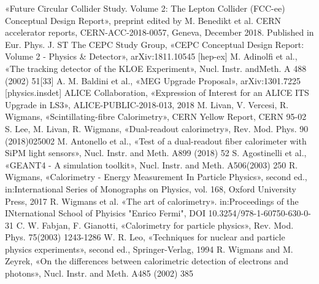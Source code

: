 \documentclass[a4paper,11pt,titlepage,oneside]{book}	%
\begin{document}
	\begin{backmatter}
		
		
		\begin{thebibliography}{99}
			
			
		     «Future Circular Collider Study. Volume 2: The Lepton Collider (FCC-ee) Conceptual Design  Report»,  preprint  edited  by  M.  Benedikt  et  al.  CERN  accelerator  reports, CERN-ACC-2018-0057, Geneva, December 2018. Published in Eur. Phys. J. ST
		     The CEPC Study Group, «CEPC Conceptual Design Report: Volume 2 - Physics & Detector», arXiv:1811.10545 [hep-ex]
		     M. Adinolfi et al., «The tracking detector of the KLOE  Experiment», Nucl. Instr. andMeth. A 488 (2002) 51[33]
		     A. M. Baldini et al., «MEG Upgrade Proposal», arXiv:1301.7225 [physics.insdet]
		     ALICE  Collaboration, «Expression  of  Interest  for  an  ALICE  ITS  Upgrade  in  LS3», ALICE-PUBLIC-2018-013, 2018
		     M. Livan,  V. Vercesi,  R. Wigmans, «Scintillating-fibre  Calorimetry»,  CERN  Yellow Report, CERN 95-02
		     S. Lee, M. Livan, R. Wigmans, «Dual-readout calorimetry», Rev. Mod. Phys. 90 (2018)025002
		      M. Antonello et al., «Test of a dual-readout fiber calorimeter with SiPM light sensors», Nucl. Instr. and Meth. A899 (2018) 52
		      S. Agostinelli et al., «GEANT4 - A simulation  toolkit», Nucl. Instr. and Meth. A506(2003) 250
			  R. Wigmans, «Calorimetry - Energy Measurement In Particle Physics», second ed., in:International  Series  of  Monographs  on  Physics,  vol.  168,  Oxford  University  Press, 2017
			 R. Wigmans et al. «The art of calorimetry». in:Proceedings of the INternational School of Phyisics "Enrico Fermi", DOI 10.3254/978-1-60750-630-0-31
			  C.  W.  Fabjan,  F.  Gianotti, «Calorimetry  for  particle  physics»,  Rev.  Mod.  Phys.  75(2003) 1243-1286
			  W. R. Leo, «Techniques for nuclear and particle physics experiments»,  second ed., Springer-Verlag, 1994
			 R.  Wigmans  and  M.  Zeyrek, «On  the  differences  between  calorimetric  detection  of electrons and photons», Nucl. Instr. and Meth. A485 (2002) 385

\end{thebibliography}
\end{backmatter}
\end{document}
